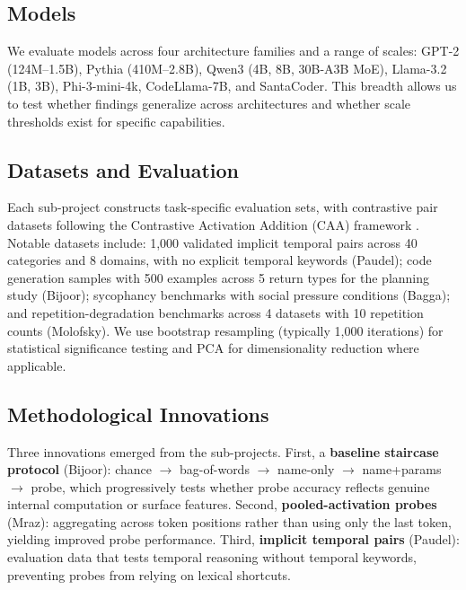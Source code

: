 \documentclass[final]{sparreport}
\begin{document}
\subsection{Models}

We evaluate models across four architecture families and a range of scales: GPT-2 (124M--1.5B), Pythia (410M--2.8B), Qwen3 (4B, 8B, 30B-A3B MoE), Llama-3.2 (1B, 3B), Phi-3-mini-4k, CodeLlama-7B, and SantaCoder. This breadth allows us to test whether findings generalize across architectures and whether scale thresholds exist for specific capabilities.

\subsection{Datasets and Evaluation}

Each sub-project constructs task-specific evaluation sets, with contrastive pair datasets following the Contrastive Activation Addition (CAA) framework \cite{rimsky2024steering}. Notable datasets include: 1,000 validated implicit temporal pairs across 40 categories and 8 domains, with no explicit temporal keywords (Paudel); code generation samples with 500 examples across 5 return types for the planning study (Bijoor); sycophancy benchmarks with social pressure conditions (Bagga); and repetition-degradation benchmarks across 4 datasets with 10 repetition counts (Molofsky). We use bootstrap resampling (typically 1,000 iterations) for statistical significance testing and PCA for dimensionality reduction where applicable.

\subsection{Methodological Innovations}

Three innovations emerged from the sub-projects. First, a \textbf{baseline staircase protocol} (Bijoor): chance $\to$ bag-of-words $\to$ name-only $\to$ name+params $\to$ probe, which progressively tests whether probe accuracy reflects genuine internal computation or surface features. Second, \textbf{pooled-activation probes} (Mraz): aggregating across token positions rather than using only the last token, yielding improved probe performance. Third, \textbf{implicit temporal pairs} (Paudel): evaluation data that tests temporal reasoning without temporal keywords, preventing probes from relying on lexical shortcuts.

\end{document}
